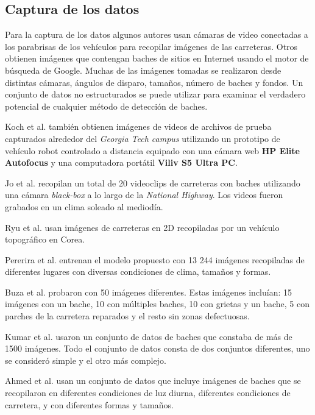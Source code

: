 	\subsection{Captura de los datos}
	Para la captura de los datos algunos autores usan cámaras de video conectadas a los  parabrisas de los vehículos para 
	recopilar imágenes de las carreteras. Otros obtienen imágenes que contengan baches de  sitios en 
	Internet usando el motor de búsqueda de Google. Muchas de las imágenes tomadas 
	se realizaron desde distintas cámaras, ángulos de disparo, tamaños, número de baches y fondos. Un conjunto de datos no estructurados se puede utilizar para examinar el verdadero potencial de cualquier método de 
	detección de baches.

	Koch et al. también obtienen  imágenes de videos de archivos de prueba capturados alrededor 
	del \emph{Georgia Tech campus} utilizando un prototipo de vehículo robot controlado a distancia equipado con una cámara web 
	\textbf{HP Elite Autofocus} y una computadora portátil \textbf{Viliv S5 Ultra PC}. 

	Jo et al.  recopilan un total de 20 videoclips de carreteras con baches utilizando una cámara 
	\emph{black-box}  a lo largo de la \emph{National Highway}. Los videos fueron grabados en un clima soleado al mediodía.

	Ryu et al. usan imágenes de carreteras en 2D recopiladas por un vehículo topográfico
	en Corea. 

	Pererira et al. entrenan el modelo propuesto  con 13 244 imágenes recopiladas de diferentes
	lugares con diversas condiciones de clima, tamaños y formas.

	Buza et al. probaron con 50 imágenes diferentes. Estas imágenes incluían: 15 imágenes con un bache, 10 con
	múltiples baches, 10 con grietas y un bache, 5 con parches de la carretera reparados y el resto sin zonas defectuosas.

	Kumar et al. usaron un conjunto de datos de baches que constaba de más de 1500 imágenes.
	Todo el conjunto de datos consta de dos conjuntos diferentes, uno se consideró simple y el otro más complejo.

	Ahmed et al. usan un conjunto de datos que incluye imágenes de baches que se recopilaron en diferentes condiciones de luz 
	diurna, diferentes condiciones de carretera, y con diferentes formas y tamaños.


